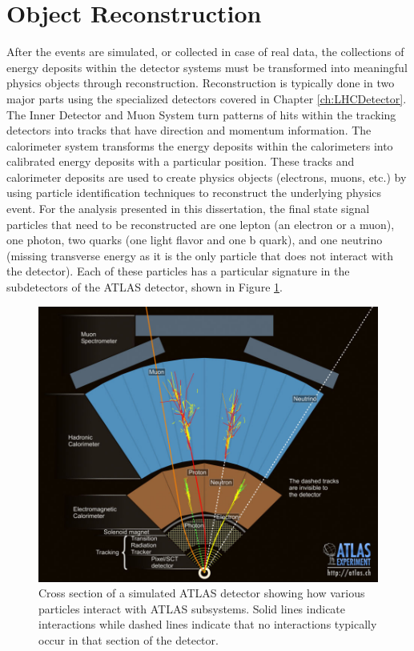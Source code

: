 \newpage
\section{Object Reconstruction}
\label{sec':ObjReco}
After the events are simulated, or collected in case of real data, the collections of energy deposits within the detector systems must be transformed into meaningful physics objects through reconstruction.  Reconstruction is typically done in two major parts using the specialized detectors covered in Chapter \ref{ch:LHCDetector}.  The Inner Detector and Muon System turn patterns of hits within the tracking detectors into tracks that have direction and momentum information.  The calorimeter system transforms the energy deposits within the calorimeters into calibrated energy deposits with a particular position.  These tracks and calorimeter deposits are used to create physics objects (electrons, muons, etc.) by using particle identification techniques to reconstruct the underlying physics event.  For the analysis presented in this dissertation, the final state signal particles that need to be reconstructed are one lepton (an electron or a muon), one photon, two quarks (one light flavor and one b quark), and one neutrino (missing transverse energy as it is the only particle that does not interact with the detector).  Each of these particles has a particular signature in the subdetectors of the ATLAS detector, shown in Figure \ref{fig:ATLASInteractions}.

\begin{figure}[h]
	\centering
	\includegraphics[width=\columnwidth]{../ThesisImages/Simulation/ParticleInteractions.jpg}
	\caption[Cross section of a simulated ATLAS detector showing how various particles interact with ATLAS subsystems.]{Cross section of a simulated ATLAS detector showing how various particles interact with ATLAS subsystems.  Solid lines indicate interactions while dashed lines indicate that no interactions typically occur in that section of the detector. \cite{ParticleInteractions} 
	}
	\label{fig:ATLASInteractions}
\end{figure}


